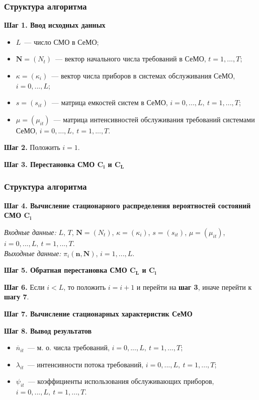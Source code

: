 \begin{frame} \frametitle{Структура алгоритма}
\textbf{Шаг 1. Ввод исходных данных}

\begin{itemize}
\item $L$~--- число СМО в СеМО;
\item $\mathbf{N}=(N_t)$~--- вектор начального числа требований в СеМО, $t=1,...,T$;
\item $\kappa=(\kappa_i)$~--- вектор числа приборов в системах обслуживания СеМО, $i=0,...,L$;
\item $s=(s_{it})$~--- матрица емкостей систем в СеМО, $i=0,...,L,~t=1,...,T$;
\item $\mu=(\mu_{it})$~--- матрица интенсивностей обслуживания требований системами СеМО, $i=0,...,L,~t=1,...,T$.
\end{itemize}

\textbf{Шаг 2.} Положить $i = 1$.

\textbf{Шаг 3. Перестановка СМО $\boldsymbol{C_i}$ и $\boldsymbol{C_L}$}

\end{frame}


\begin{frame} \frametitle{Структура алгоритма}

\textbf{Шаг 4. Вычисление стационарного распределения вероятностей состояний СМО $\boldsymbol{C_i}$}

\emph{Входные данные:} $L$, $T$, $\mathbf{N}=(N_t)$, $\kappa=(\kappa_i)$, $s=(s_{it})$, $\mu=(\mu_{it})$, $i=0,...,L,~t=1,...,T$.\\
\emph{Выходные данные:} $\pi_i(\mathbf{n},\mathbf{N})$, $i=1,...,L$.

\textbf{Шаг 5. Обратная перестановка СМО $\boldsymbol{C_L}$ и $\boldsymbol{C_i}$}

\textbf{Шаг 6.} Если $i < L$, то положить $i=i+1$ и перейти на \textbf{шаг 3}, иначе перейти к \textbf{шагу 7}.

\textbf{Шаг 7. Вычисление стационарных характеристик СеМО}

\textbf{Шаг 8. Вывод результатов}

\begin{itemize}
\item $\overline{n}_{it}$~--- м. о. числа требований, $i=0,...,L,~t=1,...,T$;
\item $\lambda_{it}$~--- интенсивности потока требований, $i=0,...,L,~t=1,...,T$;
\item $\psi_{it}$~--- коэффициенты использования обслуживающих приборов, $i=0,...,L,~t=1,...,T$.
\end{itemize}
\end{frame}

